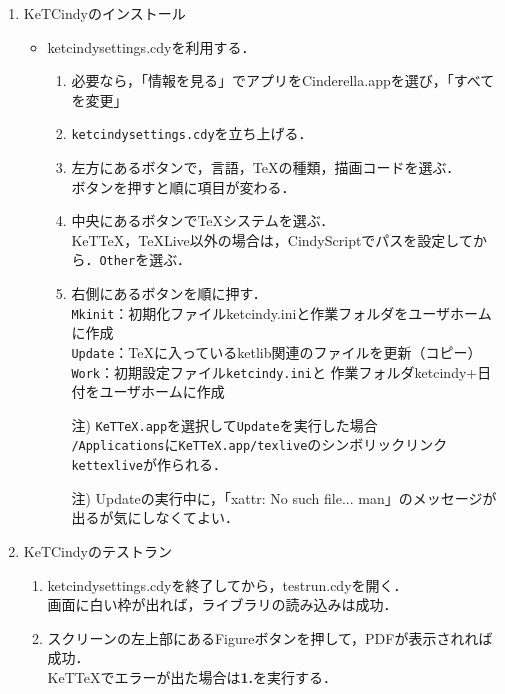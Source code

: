 \documentclass{ujarticle}
\begin{document}
\begin{enumerate}[\bf\large 1.]
\item KeTCindyのインストール
\begin{itemize}
\item ketcindysettings.cdyを利用する．
\begin{enumerate}[(1)]
\item 必要なら，「情報を見る」でアプリをCinderella.appを選び，「すべてを変更」
\item \verb|ketcindysettings.cdy|を立ち上げる．
\item 左方にあるボタンで，言語，TeXの種類，描画コードを選ぶ．\\
\hspace*{10mm}ボタンを押すと順に項目が変わる．
\item 中央にあるボタンでTeXシステムを選ぶ．\\
\hspace*{10mm}KeTTeX，TeXLive以外の場合は，CindyScriptでパスを設定してから．\verb|Other|を選ぶ．
\item 右側にあるボタンを順に押す．\\
\hspace*{5mm}\verb|Mkinit|：初期化ファイルketcindy.iniと作業フォルダをユーザホームに作成\\
\hspace*{5mm}\verb|Update|：TeXに入っているketlib関連のファイルを更新（コピー）\\
\hspace*{5mm}\verb|Work|：初期設定ファイル\verb|ketcindy.ini|と
作業フォルダketcindy+日付をユーザホームに作成
\item[注)]\verb|KeTTeX.app|を選択して\verb|Update|を実行した場合\\
\hspace*{5mm}\verb|/Applications|に\verb|KeTTeX.app/texlive|のシンボリックリンク\verb|kettexlive|が作られる．
\item[注)]Updateの実行中に，「xattr: No such file... man」のメッセージが出るが気にしなくてよい．
\end{enumerate}
\end{itemize}

  \item KeTCindyのテストラン
    \begin{enumerate}[(1)]
    \item ketcindysettings.cdyを終了してから，testrun.cdyを開く．\\
      \hspace*{10mm}画面に白い枠が出れば，ライブラリの読み込みは成功．
    \item スクリーンの左上部にあるFigureボタンを押して，PDFが表示されれば成功．\\
\hspace*{10mm}KeTTeXでエラーが出た場合は{\bf 1.}を実行する．
\end{enumerate}


\end{enumerate}
\end{document}
